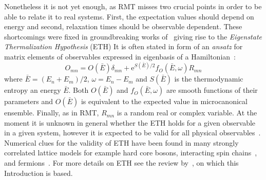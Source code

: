 Nonetheless it is not yet enough, as RMT misses two crucial points in order to be able to relate
it to real systems. First, the expectation values should depend on energy and second, relaxation
times should be observable dependent. These shortcomings were fixed in groundbreaking works
of~\textcite{Deutsch19912046,Srednicki1994} giving rise to the \textit{Eigenstate Thermalization Hypothesis} (ETH)
It is often stated in form of an \textit{ansatz} for matrix elements of observables expressed in
eigenbasis of a Hamiltonian~\autocite{Srednicki1999}:
\begin{equation}
    O_{mn} = O(\bar{E}) \delta_{mn} + \mathrm{e}^{S(\bar{E})/2}f_{O}(\bar{E},\omega)R_{mn}
    \label{eq:ETH}
\end{equation}
where \(\bar{E} = (E_n+E_m)/2\), \(\omega=E_n-E_m\) and \(S(\bar{E})\) is the thermodynamic
entropy an energy \(\bar{E}\). Both \(O(\bar{E})\) and \(f_{O}(\bar{E},\omega)\) are smooth
functions of their parameters and \(O(\bar{E})\) is equivalent to the expected value in microcanonical
ensemble. Finally, as in RMT, \(R_{mn}\) is a random real or complex variable. At the moment it is
unknown in general whether the ETH holds for a given observable in a given system,
however it is expected to be valid for all physical observables~\autocite{DAlessio2016}. 
Numerical clues for the validity of ETH have been found in many strongly correlated lattice models
for example hard core bosons, interacting spin chains~\autocite{Santos2010,Rigol2010,Khatami2013,Rigol2009a},
and fermions~\autocite{Neuenhahn2012,Rigol2009}. For more details on ETH see
the review by~\textcite{DAlessio2016}, on which this Introduction is based.


